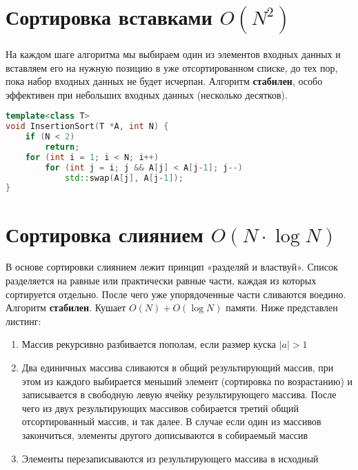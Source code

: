 \section{Сортировка вставками $O(N^2)$}
На каждом шаге алгоритма мы выбираем один из элементов входных данных и вставляем его на нужную позицию в уже отсортированном списке, до тех пор, пока набор входных данных не будет исчерпан.\newline
Алгоритм \textbf{стабилен}, особо эффективен при небольших входных данных (несколько десятков).
\begin{lstlisting}[language=C++]
template<class T> 
void InsertionSort(T *A, int N) {
    if (N < 2) 
    	return;
	for (int i = 1; i < N; i++)
    	for (int j = i; j && A[j] < A[j-1]; j--)
        	std::swap(A[j], A[j-1]);
}
\end{lstlisting}

\section{Сортировка слиянием $O(N\cdot \log{N})$}
В основе сортировки слиянием лежит принцип «разделяй и властвуй». Список разделяется на равные или практически равные части, каждая из которых сортируется отдельно. После чего уже упорядоченные части сливаются воедино. Алгоритм \textbf{стабилен}. Кушает $O(N) + O(\log{N})$ памяти. Ниже представлен листинг:
\begin{enumerate}
\item Массив рекурсивно разбивается пополам, если размер куска $|a| > 1$
\item Два единичных массива сливаются в общий результирующий массив, при этом из каждого выбирается меньший элемент (сортировка по возрастанию) и записывается в свободную левую ячейку результирующего массива. После чего из двух результирующих массивов собирается третий общий отсортированный массив, и так далее. В случае если один из массивов закончиться, элементы другого дописываются в собираемый массив
\item  Элементы перезаписываются из результирующего массива в исходный
\end{enumerate}

